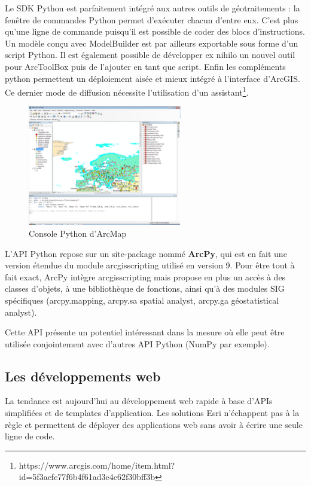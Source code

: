\documentclass[11pt]{article}
\begin{document}
Le SDK Python est parfaitement intégré aux autres outils de géotraitements : la fenêtre de commandes Python permet d'exécuter chacun d'entre eux. C'est plus qu'une ligne de commande puisqu'il est possible de coder des blocs d'instructions. Un modèle conçu avec ModelBuilder est par ailleurs exportable sous forme d'un script Python. Il est également possible de développer ex nihilo un nouvel outil pour ArcToolBox puis de l'ajouter en tant que script. Enfin les compléments python permettent un déploiement aisée et mieux intégré à l'interface d'ArcGIS. Ce dernier mode de diffusion nécessite l'utilisation d'un assistant\footnote{https://www.arcgis.com/home/item.html?id=5f3aefe77f6b4f61ad3e4c62f30bff3b}.

\begin{figure}[H]
	\center \includegraphics[width=0.6\textwidth]{img/cours/console_python.png}
	\caption{Console Python d'ArcMap}
\end{figure}

L'API Python repose sur un site-package nommé \textbf{ArcPy}, qui est en fait une version étendue du module arcgisscripting utilisé en version 9. Pour être tout à fait exact, ArcPy intègre arcgisscripting mais propose en plus un accès à des classes d'objets, à une bibliothèque de fonctions, ainsi qu'à des modules SIG spécifiques (arcpy.mapping, arcpy.sa spatial analyst, arcpy.ga géostatistical analyst).

Cette API présente un potentiel intéressant dans la mesure où elle peut être utilisée conjointement avec d'autres API Python (NumPy par exemple).


\subsection{Les développements web}
La tendance est aujourd'hui au développement web rapide à base d'APIs simplifiées et de templates d'application. Les solutions Esri n'échappent pas à la règle et permettent de déployer des applications web sans avoir à écrire une seule ligne de code. 
\end{document}
